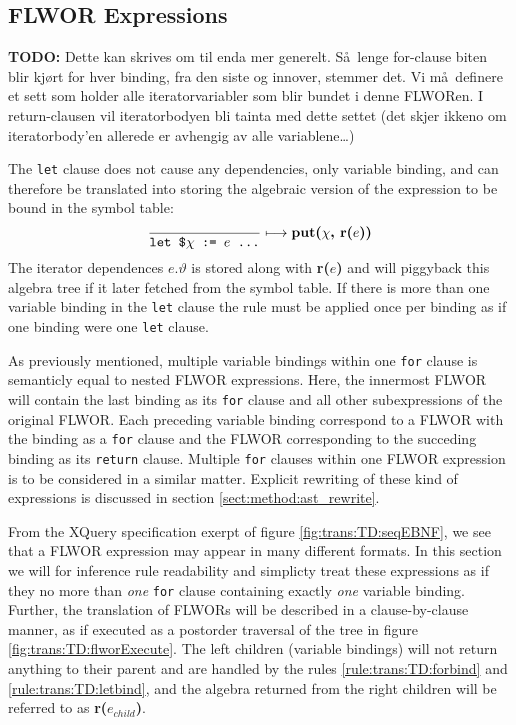 \subsection{FLWOR Expressions}
\label{sect:trans:TD:simpleFLWOR}
\textbf{\Large TODO:} Dette kan skrives om til enda mer generelt. S\aa~lenge for-clause biten blir kj\o rt for
hver binding, fra den siste og innover, stemmer det. Vi m\aa~definere et sett som holder alle iteratorvariabler
som blir bundet i denne FLWORen. I return-clausen vil iteratorbodyen bli tainta med dette settet (det skjer ikkeno
om iteratorbody'en allerede er avhengig av alle variablene\ldots)

The \texttt{let} clause does not cause any dependencies, only variable binding, and can therefore be translated
into storing the algebraic version of the expression to be bound in the symbol table:
\begin{equation}
\frac{}{\mbox{\texttt{let \$}}\chi \mbox{\texttt{ := }}e \mbox{\texttt{ \ldots}}}\longmapsto
\mbox{\textbf{put(}}\chi\mbox{\textbf{, r(}}e\mbox{\textbf{))}}
\label{rule:trans:TD:letbind}
\end{equation}
The iterator dependences $e.\vartheta$ is stored along with \textbf{r(}$e$\textbf{)} and will piggyback this
algebra tree if it later fetched from the symbol table. If there is more than one variable binding in the
\texttt{let} clause the rule must be applied once per binding as if one binding were one \texttt{let} clause.

As previously mentioned, multiple variable bindings within one \texttt{for} clause is semanticly equal to
nested FLWOR expressions. Here, the innermost FLWOR will contain the last binding as its \texttt{for} clause and
all other subexpressions of the original FLWOR. Each preceding variable binding correspond to a FLWOR with the
binding as a \texttt{for} clause and the FLWOR corresponding to the succeding binding as its \texttt{return}
clause. Multiple \texttt{for} clauses within one FLWOR expression is to be considered in a similar matter.
Explicit rewriting of these kind of expressions is discussed in section \ref{sect:method:ast_rewrite}.

From the XQuery specification exerpt of figure \ref{fig:trans:TD:seqEBNF}, we see that a FLWOR expression may
appear in many different formats. In this section we will for inference rule readability and simplicty treat these
expressions as if they no more than \emph{one} \texttt{for} clause containing exactly \emph{one} variable binding.
Further, the translation of FLWORs will be described in a clause-by-clause manner, as if executed as a postorder
traversal of the tree in figure \ref{fig:trans:TD:flworExecute}. The left children (variable bindings) will not
return anything to their parent and are handled by the rules \ref{rule:trans:TD:forbind} and
\ref{rule:trans:TD:letbind}, and the algebra returned from the right children will be referred to as
\textbf{r(}$e_{child}$\textbf{)}.

